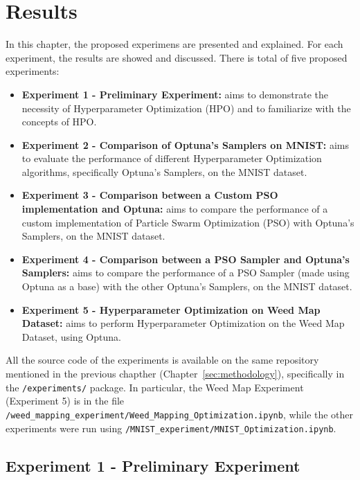 \chapter{Results}\label{sec:results}

In this chapter, the proposed experimens are presented and explained. For each experiment, the results are showed and discussed.
There is total of five proposed experiments:
\begin{itemize}[itemsep=0.1cm]
    \item \textbf{Experiment 1 - Preliminary Experiment:} aims to demonstrate the necessity of Hyperparameter Optimization (HPO) and to familiarize with the concepts of HPO.
    \item \textbf{Experiment 2 - Comparison of Optuna's Samplers on MNIST:} aims to evaluate the performance of different Hyperparameter Optimization algorithms, specifically Optuna's Samplers, on the MNIST dataset.
    \item \textbf{Experiment 3 - Comparison between a Custom PSO implementation and Optuna:} aims to compare the performance of a custom implementation of Particle Swarm Optimization (PSO) with Optuna's Samplers, on the MNIST dataset.
    \item \textbf{Experiment 4 - Comparison between a PSO Sampler and Optuna's Samplers:} aims to compare the performance of a PSO Sampler (made using Optuna as a base) with the other Optuna's Samplers, on the MNIST dataset.
    \item \textbf{Experiment 5 - Hyperparameter Optimization on Weed Map Dataset:} aims to perform Hyperparameter Optimization on the Weed Map Dataset, using Optuna.
\end{itemize}

All the source code of the experiments is available on the same repository \cite{Repository-THESIS} mentioned in the previous chapther (Chapter~\ref{sec:methodology}), specifically in the \texttt{/experiments/} package.
In particular, the Weed Map Experiment (Experiment 5) is in the file \newline\texttt{/weed\_mapping\_experiment/Weed\_Mapping\_Optimization.ipynb}, while the other experiments were run using \texttt{/MNIST\_experiment/MNIST\_Optimization.ipynb}.

\section{Experiment 1 - Preliminary Experiment}

